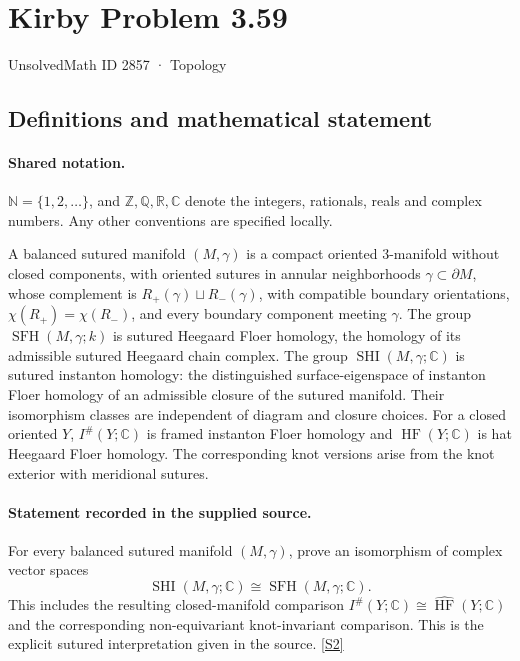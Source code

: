 \documentclass[11pt]{article}
\newcommand{\sref}[2]{\hyperlink{source:#1:#2}{[S#2]}}
\begin{document}
\setcounter{section}{2856}
\section{Kirby Problem 3.59}\label{2857}
{\small\sffamily UnsolvedMath ID 2857 · Topology}
\subsection{Definitions and mathematical statement}

\paragraph{Shared notation.}$\mathbb N=\{1,2,\ldots\}$, and $\mathbb Z,\mathbb Q,\mathbb R,\mathbb C$ denote the integers, rationals, reals and complex numbers. Any other conventions are specified locally.


A balanced sutured manifold $(M,\gamma)$ is a compact oriented $3$-manifold without closed components, with oriented sutures in annular neighborhoods $\gamma\subset\partial M$, whose complement is $R_+(\gamma)\sqcup R_-(\gamma)$, with compatible boundary orientations, $\chi(R_+)=\chi(R_-)$, and every boundary component meeting $\gamma$. The group $\operatorname{SFH}(M,\gamma;k)$ is sutured Heegaard Floer homology, the homology of its admissible sutured Heegaard chain complex. The group $\operatorname{SHI}(M,\gamma;\mathbb C)$ is sutured instanton homology: the distinguished surface-eigenspace of instanton Floer homology of an admissible closure of the sutured manifold. Their isomorphism classes are independent of diagram and closure choices. For a closed oriented $Y$, $I^\#(Y;\mathbb C)$ is framed instanton Floer homology and $\widehat{\operatorname{HF}}(Y;\mathbb C)$ is hat Heegaard Floer homology. The corresponding knot versions arise from the knot exterior with meridional sutures.
\paragraph{Statement recorded in the supplied source.}
For every balanced sutured manifold $(M,\gamma)$, prove an isomorphism of complex vector spaces
\[
\operatorname{SHI}(M,\gamma;\mathbb C)\cong\operatorname{SFH}(M,\gamma;\mathbb C).
\]
This includes the resulting closed-manifold comparison $I^\#(Y;\mathbb C)\cong\widehat{\operatorname{HF}}(Y;\mathbb C)$ and the corresponding non-equivariant knot-invariant comparison. This is the explicit sutured interpretation given in the source. \sref{2857}{2}
\end{document}
